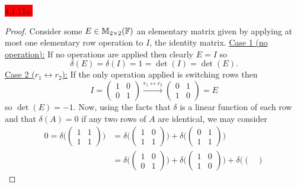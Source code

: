 \documentclass{exam}
\begin{document}
  \colorbox{red}{\underline{$4.1.11a$}:}
  \begin{solution}
    \begin{proof}
      Consider some $E \in \mathbb M_{2 \times 2}(\mathbb F)$ an elementary matrix given by applying at most one elementary row operation to $I$, the identity matrix. 
      \newline\underline{Case 1 (no operation):} If no operations are applied then clearly $E = I$ so 
      \[
        \delta(E) = \delta(I) = 1 = \det(I) = \det(E).
      \]
      \newline\underline{Case 2 ($r_1 \leftrightarrow r_2$):} If the only operation applied is switching rows then 
      \[
        I = \begin{pmatrix}
          1 & 0 \\ 0 & 1
        \end{pmatrix} 
        \xrightarrow{r_1 \leftrightarrow r_2} 
        \begin{pmatrix}
          0 & 1 \\
          1 & 0 
        \end{pmatrix} = E
      \]
      so $\det(E) = -1$. Now, using the facts that $\delta$ is a linear function of each row and that $\delta(A) = 0$ if any two rows of $A$ are identical, we may consider 
      \begin{align*}
        0 = \delta\Biggl(\begin{pmatrix}
          1 & 1 \\ 1 & 1
        \end{pmatrix}\Biggr) 
        &= \delta\Biggl(\begin{pmatrix}
          1 & 0 \\
          1 & 1 
         \end{pmatrix}\Biggr)
         + \delta\Biggl(\begin{pmatrix}
          0 & 1 \\
          1 & 1 
         \end{pmatrix}\Biggr) \\
        &= \delta\Biggl(\begin{pmatrix}
          1 & 0 \\
          0 & 1 
         \end{pmatrix}\Biggr)
         + \delta\Biggl(\begin{pmatrix}
          1 & 0 \\
          1 & 0 
         \end{pmatrix}\Biggr)
         + \delta\Biggl(\begin{pmatrix}

\end{pmatrix}
\end{align*}
\end{proof}
\end{solution}
\end{document}
